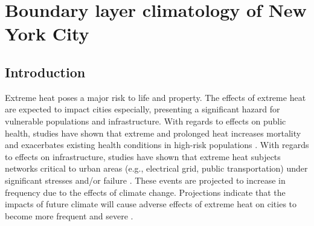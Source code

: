 \chapter{Boundary layer climatology of New York City}
\label{chapter:climatology}
\thispagestyle{myheadings}

\graphicspath{{3_Pub2/}}


\section{Introduction} \label{section:introduction}

Extreme heat poses a major risk to life and property. The effects of extreme heat are expected to impact cities especially, presenting a significant hazard for vulnerable populations and infrastructure. With regards to effects on public health, studies have shown that extreme and prolonged heat increases mortality and exacerbates existing health conditions in high-risk populations \citep{anderson2011, frumkin2016, heaviside2017, madrigano2015}. With regards to effects on infrastructure, studies have shown that extreme heat subjects networks critical to urban areas (e.g., electrical grid, public transportation) under significant stresses and/or failure \citep{mcevoy2012, zuo2015}. These events are projected to increase in frequency due to the effects of climate change. Projections indicate that the impacts of future climate will cause adverse effects of extreme heat on cities to become more frequent and severe \citep{burillo2019, forzieri2018, peng2011}.

